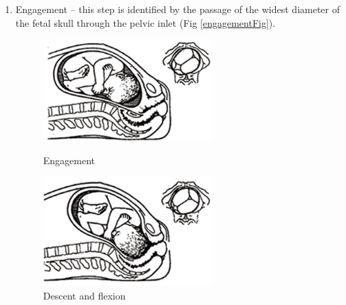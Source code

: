 \begin{enumerate}
\item Engagement -- this step is identified by the passage of the widest diameter of the fetal skull through the pelvic inlet (Fig \ref{engagementFig}).


\begin{figure}
\begin{minipage}[t]{6cm}
\begin{center}
\includegraphics[width=65mm]{sections/introduction/images/Justengagement.png}
\caption{\label{engagementFig} Engagement}
\end{center}
\end{minipage}
\hfill
\begin{minipage}[t]{6cm}
\begin{center}
\includegraphics[width=65mm]{sections/introduction/images/Engagementflexion.png}
\caption[Descent and flexion]{\label{flexionFIg} Descent and flexion}
\end{center}
\end{minipage}
\end{figure}



\end{enumerate}
